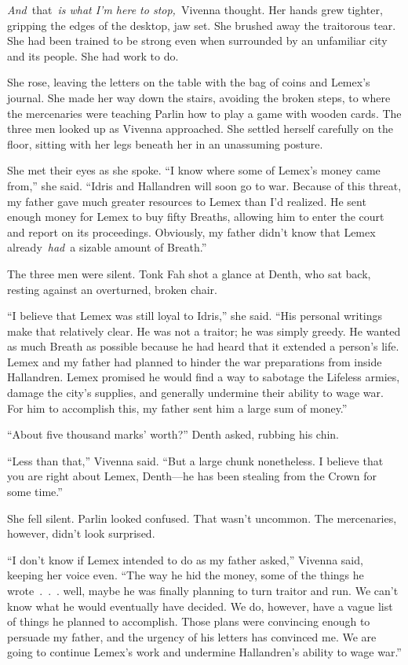 \textit{And}~that~\textit{is what I’m here to stop,}~Vivenna thought. Her hands grew tighter, gripping the edges of the desktop, jaw set. She brushed away the traitorous tear. She had been trained to be strong even when surrounded by an unfamiliar city and its people. She had work to do.

She rose, leaving the letters on the table with the bag of coins and Lemex’s journal. She made her way down the stairs, avoiding the broken steps, to where the mercenaries were teaching Parlin how to play a game with wooden cards. The three men looked up as Vivenna approached. She settled herself carefully on the floor, sitting with her legs beneath her in an unassuming posture.

She met their eyes as she spoke. “I know where some of Lemex’s money came from,” she said. “Idris and Hallandren will soon go to war. Because of this threat, my father gave much greater resources to Lemex than I’d realized. He sent enough money for Lemex to buy fifty Breaths, allowing him to enter the court and report on its proceedings. Obviously, my father didn’t know that Lemex already~\textit{had}~a sizable amount of Breath.”

The three men were silent. Tonk Fah shot a glance at Denth, who sat back, resting against an overturned, broken chair.

“I believe that Lemex was still loyal to Idris,” she said. “His personal writings make that relatively clear. He was not a traitor; he was simply greedy. He wanted as much Breath as possible because he had heard that it extended a person’s life. Lemex and my father had planned to hinder the war preparations from inside Hallandren. Lemex promised he would find a way to sabotage the Lifeless armies, damage the city’s supplies, and generally undermine their ability to wage war. For him to accomplish this, my father sent him a large sum of money.”

“About five thousand marks’ worth?” Denth asked, rubbing his chin.

“Less than that,” Vivenna said. “But a large chunk nonetheless. I believe that you are right about Lemex, Denth—he has been stealing from the Crown for some time.”

She fell silent. Parlin looked confused. That wasn’t uncommon. The mercenaries, however, didn’t look surprised.

“I don’t know if Lemex intended to do as my father asked,” Vivenna said, keeping her voice even. “The way he hid the money, some of the things he wrote~.~.~. well, maybe he was finally planning to turn traitor and run. We can’t know what he would eventually have decided. We do, however, have a vague list of things he planned to accomplish. Those plans were convincing enough to persuade my father, and the urgency of his letters has convinced me. We are going to continue Lemex’s work and undermine Hallandren’s ability to wage war.”

